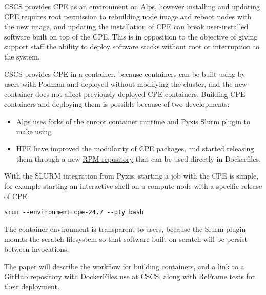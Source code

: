 CSCS provides CPE as an environment on Alps, however installing and updating CPE requires root permission to rebuilding node image and reboot nodes with the new image, and updating the installation of CPE can break user-installed software built on top of the CPE.
This is in opposition to the objective of giving support staff the ability to deploy software stacks without root or interruption to the system.

CSCS provides CPE in a container, because containers can be built using by users with Podman and deployed without modifying the cluster, and the new container does not affect previously deployed CPE containers.
Building CPE containers and deploying them is possible because of two developments:
\begin{itemize}
       \item Alps uses forks of the \href{https://github.com/NVIDIA/enroot}{enroot} container runtime and \href{https://github.com/NVIDIA/pyxis}{Pyxis} Slurm plugin to make using
       \item HPE have improved the modularity of CPE packages, and started releasing them through a new \href{https://cpe.ext.hpe.com/docs/latest/install/installation-guidance-container.html}{RPM repository} that can be used directly in Dockerfiles.
\end{itemize}


With the SLURM integration from Pyxis, starting a job with the CPE is simple, for example starting an interactive shell on a compute node with a specific release of CPE:
\begin{lstlisting}
srun --environment=cpe-24.7 --pty bash
\end{lstlisting}
The container environment is transparent to users, because the Slurm plugin mounts the scratch filesystem so that software built on scratch will be persist between invocations.

The paper will describe the workflow for building containers, and a link to a GitHub repository with DockerFiles use at CSCS, along with ReFrame tests for their deployment.
